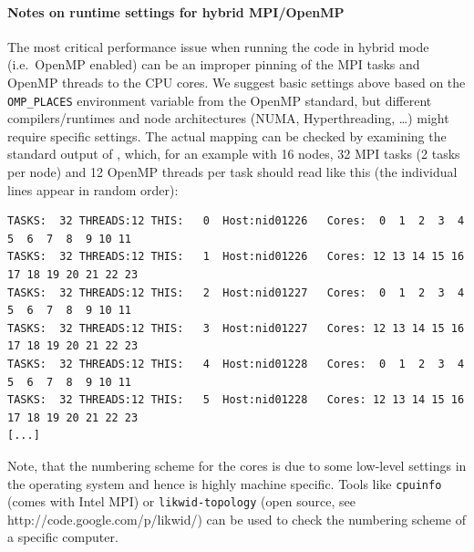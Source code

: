 \documentclass[a4paper, 11pt, DIV=11]{scrartcl}
\begin{document}
\paragraph{Notes on runtime settings for hybrid MPI/OpenMP}
The most critical performance issue when running the code in hybrid mode (i.e.\
OpenMP enabled) can be an improper pinning of the MPI tasks and OpenMP threads to
the CPU cores. We suggest basic settings above based on the \verb+OMP_PLACES+
environment variable from the OpenMP standard, but different
compilers/runtimes and node architectures (NUMA, Hyperthreading,
\dots) might require specific settings. 
The actual mapping can be checked by examining the standard
output of \nsc, which, for an example with 16 nodes, 32 MPI
tasks (2 tasks per node) and 12 OpenMP threads per task should read
like this (the individual lines appear in random order):
\begin{small}
\begin{verbatim}
TASKS:  32 THREADS:12 THIS:   0  Host:nid01226   Cores:  0  1  2  3  4  5  6  7  8  9 10 11
TASKS:  32 THREADS:12 THIS:   1  Host:nid01226   Cores: 12 13 14 15 16 17 18 19 20 21 22 23
TASKS:  32 THREADS:12 THIS:   2  Host:nid01227   Cores:  0  1  2  3  4  5  6  7  8  9 10 11
TASKS:  32 THREADS:12 THIS:   3  Host:nid01227   Cores: 12 13 14 15 16 17 18 19 20 21 22 23
TASKS:  32 THREADS:12 THIS:   4  Host:nid01228   Cores:  0  1  2  3  4  5  6  7  8  9 10 11
TASKS:  32 THREADS:12 THIS:   5  Host:nid01228   Cores: 12 13 14 15 16 17 18 19 20 21 22 23
[...]
\end{verbatim}
\end{small}

Note, that the numbering scheme for the cores is due to some
low-level settings in the operating system and hence is highly machine
specific. Tools like \verb+cpuinfo+ (comes with Intel MPI) or 
\verb+likwid-topology+ (open source, see http://code.google.com/p/likwid/)
can be used to check the numbering scheme of a specific computer.
\end{document}
